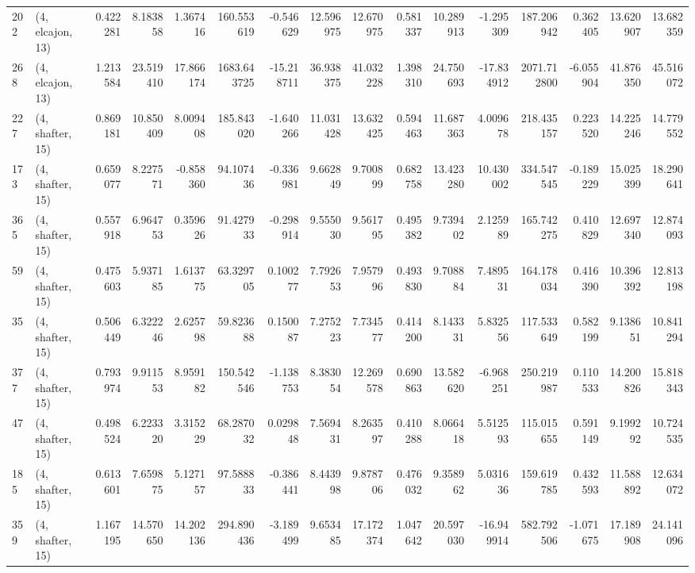 \begin{tabular}{llrrrrrrrrrrrrrr}
202 &  (4, elcajon, 13) &   0.422281 &   8.183858 &   1.367416 &   160.553619 &  -0.546629 &  12.596975 &  12.670975 &  0.581337 &  10.289913 &  -1.295309 &    187.206942 &   0.362405 &  13.620907 &   13.682359 \\
268 &  (4, elcajon, 13) &   1.213584 &  23.519410 &  17.866174 &  1683.643725 & -15.218711 &  36.938375 &  41.032228 &  1.398310 &  24.750693 & -17.834912 &   2071.712800 &  -6.055904 &  41.876350 &   45.516072 \\
227 &  (4, shafter, 15) &   0.869181 &  10.850409 &   8.009408 &   185.843020 &  -1.640266 &  11.031428 &  13.632425 &  0.594463 &  11.687363 &   4.009678 &    218.435157 &   0.223520 &  14.225246 &   14.779552 \\
173 &  (4, shafter, 15) &   0.659077 &   8.227571 &  -0.858360 &    94.107436 &  -0.336981 &   9.662849 &   9.700899 &  0.682758 &  13.423280 &  10.430002 &    334.547545 &  -0.189229 &  15.025399 &   18.290641 \\
365 &  (4, shafter, 15) &   0.557918 &   6.964753 &   0.359626 &    91.427933 &  -0.298914 &   9.555030 &   9.561795 &  0.495382 &   9.739402 &   2.125989 &    165.742275 &   0.410829 &  12.697340 &   12.874093 \\
59  &  (4, shafter, 15) &   0.475603 &   5.937185 &   1.613775 &    63.329705 &   0.100277 &   7.792653 &   7.957996 &  0.493830 &   9.708884 &   7.489531 &    164.178034 &   0.416390 &  10.396392 &   12.813198 \\
35  &  (4, shafter, 15) &   0.506449 &   6.322246 &   2.625798 &    59.823688 &   0.150087 &   7.275223 &   7.734577 &  0.414200 &   8.143331 &   5.832556 &    117.533649 &   0.582199 &   9.138651 &   10.841294 \\
377 &  (4, shafter, 15) &   0.793974 &   9.911553 &   8.959182 &   150.542546 &  -1.138753 &   8.383054 &  12.269578 &  0.690863 &  13.582620 &  -6.968251 &    250.219987 &   0.110533 &  14.200826 &   15.818343 \\
47  &  (4, shafter, 15) &   0.498524 &   6.223320 &   3.315229 &    68.287032 &   0.029848 &   7.569431 &   8.263597 &  0.410288 &   8.066418 &   5.512593 &    115.015655 &   0.591149 &   9.199292 &   10.724535 \\
185 &  (4, shafter, 15) &   0.613601 &   7.659875 &   5.127157 &    97.588833 &  -0.386441 &   8.443998 &   9.878706 &  0.476032 &   9.358962 &   5.031636 &    159.619785 &   0.432593 &  11.588892 &   12.634072 \\
359 &  (4, shafter, 15) &   1.167195 &  14.570650 &  14.202136 &   294.890436 &  -3.189499 &   9.653485 &  17.172374 &  1.047642 &  20.597030 & -16.949914 &    582.792506 &  -1.071675 &  17.189908 &   24.141096 \\

\end{tabular}
